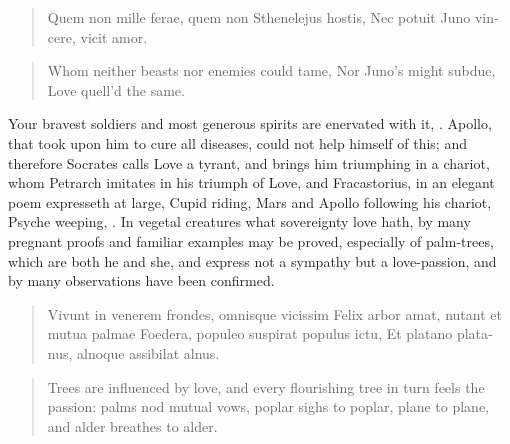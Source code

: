 \begin{latin}
\begin{verse}%
Quem non mille ferae, quem non Sthenelejus hostis,
Nec potuit Juno vincere, vicit amor.
\end{verse}%
\end{latin}
\translationrule%
\begin{verse}%
Whom neither beasts nor enemies could tame,
Nor Juno's might subdue, Love quell'd the same.
\end{verse}%

Your bravest soldiers and most generous spirits are enervated with it,
. Apollo, that took upon him to cure all diseases,
could not help himself of this; and therefore Socrates
calls Love a tyrant, and brings him triumphing in a chariot, whom
Petrarch imitates in his triumph of Love, and Fracastorius, in an
elegant poem expresseth at large, Cupid riding, Mars and Apollo
following his chariot, Psyche weeping, \etc{}.
In vegetal creatures what sovereignty love hath, by many pregnant
proofs and familiar examples may be proved, especially of palm-trees,
which are both he and she, and express not a sympathy but a
love-passion, and by many observations have been confirmed.

\begin{latin}
\begin{verse}%
Vivunt in venerem frondes, omnisque vicissim
Felix arbor amat, nutant et mutua palmae
Foedera, populeo suspirat populus ictu,
Et platano platanus, alnoque assibilat alnus.
\end{verse}%
\end{latin}
\translationrule%
\begin{verse}%
Trees are influenced by love,
and every flourishing tree in turn feels the passion:
palms nod mutual vows, poplar sighs to poplar,
plane to plane, and alder breathes to alder.
\end{verse}%

